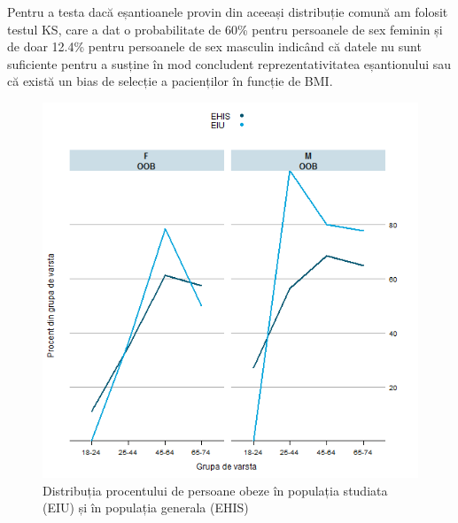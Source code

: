 \documentclass[12pt]{article}
\begin{document}
  Pentru a testa dacă eșantioanele provin din aceeași distribuție comună am folosit testul \ac{KS}, care a dat o probabilitate de 60\% pentru persoanele de sex feminin și de doar 12.4\% pentru persoanele de sex masculin indicând că datele nu sunt suficiente pentru a susține în mod concludent reprezentativitatea eșantionului sau că există un bias de selecție a pacienților în funcție de \ac{BMI}.
  \begin{figure}[H]
    \centering
    \includegraphics[width=0.8\linewidth]{incoBMIvsEHIS-OOB}
    \caption{Distribuția procentului de persoane obeze în populația studiata (EIU) și în populația generala (EHIS) }
    \label{fig:incoBMIvsEHIS-OOB}
  \end{figure}
\end{document}
